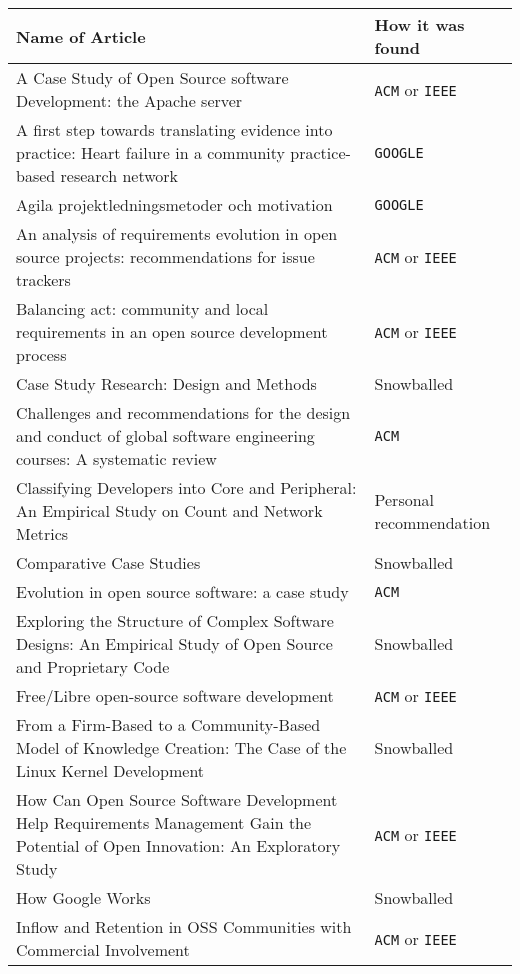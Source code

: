 \documentclass[11pt, oneside]{article}   	%
\begin{document}
\begin{table}[!h]
	\begin{tabular}{  p{}  p{} }
		\hline
		\textbf{Name of Article}	& \textbf{How it was found}	\\\hline
		A Case Study of Open Source software Development: the Apache server	& \texttt{ACM} or \texttt{IEEE}	\\\hline
		A first step towards translating evidence into practice: Heart failure in a community practice-based research network & \texttt{GOOGLE}	\\\hline
		Agila projektledningsmetoder och motivation & \texttt{GOOGLE}	\\\hline
		An analysis of requirements evolution in open source projects: recommendations for issue trackers	& \texttt{ACM} or \texttt{IEEE}	\\\hline
		Balancing act: community and local requirements in an open source development process	& \texttt{ACM} or \texttt{IEEE}	\\\hline
		Case Study Research: Design and Methods	& Snowballed	\\\hline
		Challenges and recommendations for the design and conduct of global software engineering courses: A systematic review	&  \texttt{ACM}	\\\hline
		Classifying Developers into Core and Peripheral: An Empirical Study on Count and Network Metrics	& Personal recommendation 	\\\hline
		Comparative Case Studies	& Snowballed	\\\hline
		Evolution in open source software: a case study	& \texttt{ACM}	\\\hline
		Exploring the Structure of Complex Software Designs: An Empirical Study of Open Source and Proprietary Code	& Snowballed	\\\hline
		Free/Libre open-source software development	& \texttt{ACM} or \texttt{IEEE}	\\\hline
		From a Firm-Based to a Community-Based Model of Knowledge Creation: The Case of the Linux Kernel Development	& Snowballed	\\\hline
		How Can Open Source Software Development Help Requirements Management Gain the Potential of Open Innovation: An Exploratory Study	& \texttt{ACM} or \texttt{IEEE}	\\\hline
		How Google Works	& Snowballed	\\\hline
		Inflow and Retention in OSS Communities with Commercial Involvement	& \texttt{ACM} or \texttt{IEEE}	\\\hline

\end{tabular}
\end{table}
\end{document}
